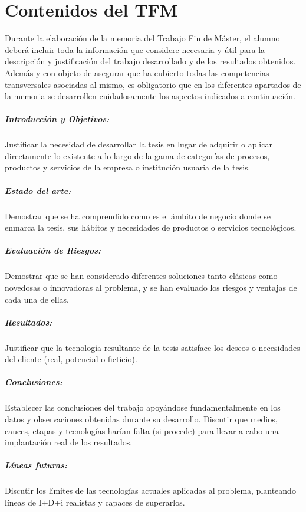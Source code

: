 \chapter{Contenidos del TFM}
Durante la elaboración de la memoria del Trabajo Fin de Máster, el alumno deberá incluir toda la información que considere necesaria y útil para la descripción y justificación del trabajo desarrollado y de los resultados obtenidos. Además y con objeto de asegurar que ha cubierto todas las competencias transversales asociadas al mismo, es obligatorio que en los diferentes apartados de la memoria se desarrollen cuidadosamente los aspectos indicados a continuación.

\paragraph{Introducción y Objetivos:}
Justificar la necesidad de desarrollar la tesis en lugar de adquirir o aplicar directamente lo existente a lo largo de la gama de categorías de procesos, productos y servicios de la empresa o institución usuaria de la tesis.

\paragraph{Estado del arte:}
Demostrar que se ha comprendido como es el ámbito de negocio donde se enmarca la tesis, sus hábitos y necesidades de productos o servicios tecnológicos.

\paragraph{Evaluación de Riesgos:}
Demostrar que se han considerado diferentes soluciones tanto clásicas como novedosas o innovadoras al problema, y se han evaluado los riesgos y ventajas de cada una de ellas.

\paragraph{Resultados:}
Justificar que la tecnología resultante de la tesis satisface los deseos o necesidades del cliente (real, potencial o ficticio).

\paragraph{Conclusiones:}
Establecer las conclusiones del trabajo apoyándose fundamentalmente en los datos y observaciones obtenidas durante su desarrollo.
Discutir que medios, cauces, etapas y tecnologías harían falta (si procede) para llevar a cabo una implantación real de los resultados.

\paragraph{Líneas futuras:}
Discutir los límites de las tecnologías actuales aplicadas al problema, planteando líneas de I+D+i realistas y capaces de superarlos.